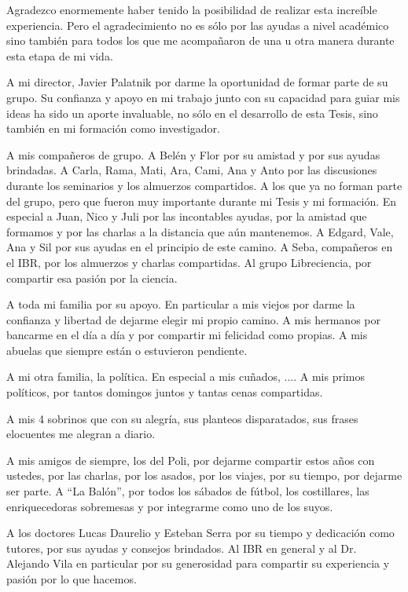 
\begin{acknowledgements}      


Agradezco enormemente haber tenido la posibilidad de realizar esta increíble experiencia.
Pero el agradecimiento no es sólo por las ayudas a nivel académico sino también para todos los que me acompañaron de una u otra manera durante esta etapa de mi vida.

A mi director, Javier Palatnik por darme la oportunidad de formar parte de su grupo.
Su confianza y apoyo en mi trabajo junto con su capacidad para guiar mis ideas ha sido un aporte invaluable, no sólo en el desarrollo de esta Tesis, sino también en mi formación como investigador.

A mis compañeros de grupo. 
A Belén y Flor por su amistad y por sus ayudas brindadas.
A Carla, Rama, Mati, Ara, Cami, Ana y Anto por las discusiones durante los seminarios y los almuerzos compartidos.
A los que ya no forman parte del grupo, pero que fueron muy importante durante mi Tesis y mi formación.
En especial a  Juan, Nico y Juli por las incontables ayudas, por la amistad que formamos y por las charlas a la distancia que aún mantenemos.
A Edgard, Vale, Ana y Sil por sus ayudas en el principio de este camino.
A Seba, compañeros en el IBR, por los almuerzos y charlas compartidas.
Al grupo Libreciencia, por compartir esa pasión por la ciencia.

A toda mi familia por su apoyo.
En particular a mis viejos por darme la confianza y libertad de dejarme elegir mi propio camino. 
A mis hermanos por bancarme en el día a día y por compartir mi felicidad como propias.
A mis abuelas que siempre están o estuvieron pendiente.

A mi otra familia, la política. 
En especial a mis cuñados, ....
A mis primos políticos, por tantos domingos juntos y tantas cenas compartidas.

A mis 4 sobrinos que con su alegría, sus planteos disparatados, sus frases elocuentes me alegran a diario.

A mis amigos de siempre, los del Poli, por dejarme compartir estos años con ustedes, por las charlas, por los asados, por los viajes, por su tiempo, por dejarme ser parte.
A ``La Balón'', por todos los sábados de fútbol, los costillares, las enriquecedoras sobremesas y por integrarme como uno de los suyos.

A los doctores Lucas Daurelio y Esteban Serra por su tiempo y dedicación como tutores, por sus ayudas y consejos brindados.
Al IBR en general y al Dr. Alejando Vila en particular por su generosidad para compartir su experiencia y pasión por lo que hacemos.


\end{acknowledgements}
